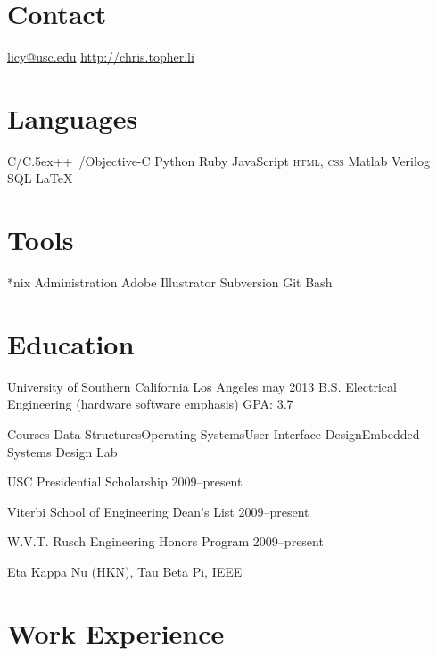 \documentclass[print]{friggeri-cv}
\def\Cplusplus{{\rm C\raise.5ex\hbox{\small ++}}~}
\begin{document}
       {}


\begin{aside}
  \section{Contact}
    \href{mailto:licy@usc.edu}{licy@usc.edu}
    \href{http://chris.topher.li}{http://chris.topher.li}
  \section{Languages}
    C/\Cplusplus/Objective-C
    Python
    Ruby
    JavaScript
    \textsc{html}, \textsc{css}
    {\sc Matlab}
    Verilog
    SQL
    \LaTeX
  \section{Tools}
    *nix Administration
    Adobe Illustrator
    Subversion
    Git
    Bash
\end{aside}

\section{Education}

\education
  {University of Southern California}
  {Los Angeles}
  {may 2013}
  {
  B.S. Electrical Engineering (hardware software emphasis) \Space GPA: 3.7
  }

\vspace{-1.0em}
\begin{entrylist}
  \project
    {Courses}
    {Data Structures\Space Operating Systems\Space User Interface Design\Space Embedded Systems Design Lab}
  
  {
    USC Presidential Scholarship 2009--present
  
    Viterbi School of Engineering Dean's List 2009--present
  
    W.V.T. Rusch Engineering Honors Program 2009--present
  }
  
  {
    Eta Kappa Nu (HKN), Tau Beta Pi, IEEE
  }
  
\end{entrylist}

\section{Work Experience}
\end{document}
